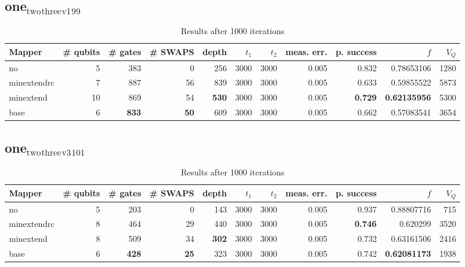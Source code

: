 \documentclass[11pt]{article}
\begin{document}
\subsection{one\(_{\text{two}}\)\(_{\text{three}}\)\(_{\text{v1}}\)\(_{\text{99}}\)}
\label{sec:org157c88f}
\begin{table}[H]
\caption{\label{tab:org8db7fc7}
Results after 1000 iterations}
\centering
\small
\begin{tabular}{lrrrrrrrrrr}
\hline
Mapper & \# qubits & \# gates & \# SWAPS & depth & \(t_1\) & \(t_2\) & meas. err. & p. success & \(f\) & \(V_Q\)\\
\hline
no & 5 & 383 & 0 & 256 & 3000 & 3000 & 0.005 & 0.832 & 0.78653106 & 1280\\
\hline
minextendrc & 7 & 887 & 56 & 839 & 3000 & 3000 & 0.005 & 0.633 & 0.59855522 & 5873\\
minextend & 10 & 869 & 54 & \textbf{530} & 3000 & 3000 & 0.005 & \textbf{0.729} & \textbf{0.62135956} & 5300\\
base & 6 & \textbf{833} & \textbf{50} & 609 & 3000 & 3000 & 0.005 & 0.662 & 0.57083541 & 3654\\
\hline
\end{tabular}
\end{table}
\subsection{one\(_{\text{two}}\)\(_{\text{three}}\)\(_{\text{v3}}\)\(_{\text{101}}\)}
\label{sec:orgcc22a0b}
\begin{table}[H]
\caption{\label{tab:org1826393}
Results after 1000 iterations}
\centering
\small
\begin{tabular}{lrrrrrrrrrr}
\hline
Mapper & \# qubits & \# gates & \# SWAPS & depth & \(t_1\) & \(t_2\) & meas. err. & p. success & \(f\) & \(V_Q\)\\
\hline
no & 5 & 203 & 0 & 143 & 3000 & 3000 & 0.005 & 0.937 & 0.88807716 & 715\\
\hline
minextendrc & 8 & 464 & 29 & 440 & 3000 & 3000 & 0.005 & \textbf{0.746} & 0.620299 & 3520\\
minextend & 8 & 509 & 34 & \textbf{302} & 3000 & 3000 & 0.005 & 0.732 & 0.63161506 & 2416\\
base & 6 & \textbf{428} & \textbf{25} & 323 & 3000 & 3000 & 0.005 & 0.742 & \textbf{0.62081173} & 1938\\
\hline
\end{tabular}
\end{table}
\end{document}
